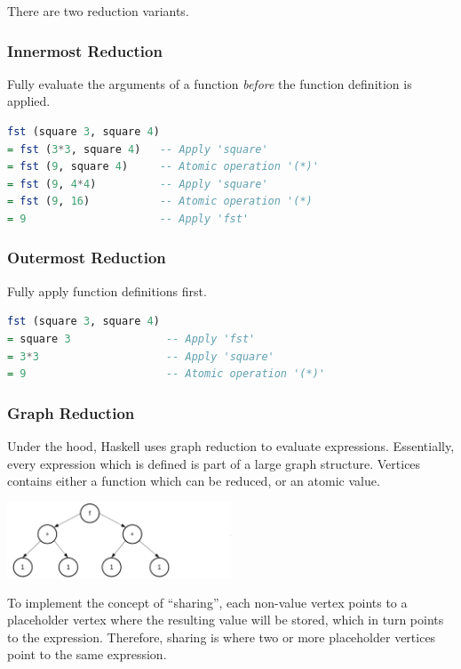 There are two reduction variants.

\subsubsection{Innermost Reduction}
Fully evaluate the arguments of a function \textit{before} the function definition is applied.

\begin{lstlisting}[language=haskell]
fst (square 3, square 4)
= fst (3*3, square 4)   -- Apply 'square'
= fst (9, square 4)     -- Atomic operation '(*)'
= fst (9, 4*4)          -- Apply 'square'
= fst (9, 16)           -- Atomic operation '(*)
= 9                     -- Apply 'fst'
\end{lstlisting}

\subsubsection{Outermost Reduction}
Fully apply function definitions first.

\begin{lstlisting}[language=haskell]
fst (square 3, square 4)
= square 3               -- Apply 'fst'
= 3*3                    -- Apply 'square'
= 9                      -- Atomic operation '(*)'
\end{lstlisting}

\subsubsection{Graph Reduction}
Under the hood, Haskell uses graph reduction to evaluate expressions. Essentially, every expression which is defined is part of a large graph structure. Vertices contains either a function which can be reduced, or an atomic value.

\medskip
\includegraphics[width=0.5\textwidth]{latex/assets/graph-reduction.png}

To implement the concept of ``sharing'', each non-value vertex points to a placeholder vertex where the resulting value will be stored, which in turn points to the expression. Therefore, sharing is where two or more placeholder vertices point to the same expression.

